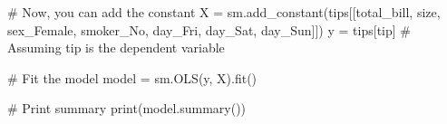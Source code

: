 \documentclass[
  letterpaper,
  DIV=11,
  numbers=noendperiod]{scrreprt}
\newenvironment{Shaded}{\begin{snugshade}}{\end{snugshade}}
\newcommand{\BuiltInTok}[1]{\textcolor[rgb]{0.00,0.23,0.31}{#1}}
\newcommand{\CommentTok}[1]{\textcolor[rgb]{0.37,0.37,0.37}{#1}}
\newcommand{\NormalTok}[1]{\textcolor[rgb]{0.00,0.23,0.31}{#1}}
\newcommand{\OperatorTok}[1]{\textcolor[rgb]{0.37,0.37,0.37}{#1}}
\newcommand{\StringTok}[1]{\textcolor[rgb]{0.13,0.47,0.30}{#1}}
\begin{document}
\begin{Shaded}
\begin{Highlighting}[]
\CommentTok{\# Now, you can add the constant}
\NormalTok{X }\OperatorTok{=}\NormalTok{ sm.add\_constant(tips[[}\StringTok{\textquotesingle{}total\_bill\textquotesingle{}}\NormalTok{, }\StringTok{\textquotesingle{}size\textquotesingle{}}\NormalTok{, }\StringTok{\textquotesingle{}sex\_Female\textquotesingle{}}\NormalTok{, }\StringTok{\textquotesingle{}smoker\_No\textquotesingle{}}\NormalTok{, }\StringTok{\textquotesingle{}day\_Fri\textquotesingle{}}\NormalTok{, }\StringTok{\textquotesingle{}day\_Sat\textquotesingle{}}\NormalTok{, }\StringTok{\textquotesingle{}day\_Sun\textquotesingle{}}\NormalTok{]])}
\NormalTok{y }\OperatorTok{=}\NormalTok{ tips[}\StringTok{\textquotesingle{}tip\textquotesingle{}}\NormalTok{]  }\CommentTok{\# Assuming \textquotesingle{}tip\textquotesingle{} is the dependent variable}

\CommentTok{\# Fit the model}
\NormalTok{model }\OperatorTok{=}\NormalTok{ sm.OLS(y, X).fit()}

\CommentTok{\# Print summary}
\BuiltInTok{print}\NormalTok{(model.summary())}
\end{Highlighting}
\end{Shaded}
\end{document}
